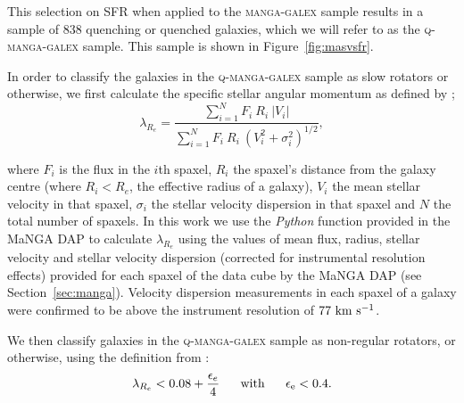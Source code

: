\documentclass[useAMS,usenatbib]{mn2e}
\begin{document}
This selection on SFR when applied to the \textsc{manga-galex} sample results in a sample of $838$ quenching or quenched galaxies, which we will refer to as the \textsc{q-manga-galex} sample. This sample is shown in Figure~\ref{fig:masvsfr}.


In order to classify the galaxies in the \textsc{q-manga-galex} sample as slow rotators or otherwise, we first calculate the specific stellar angular momentum as defined by \cite{emsellem07, emsellem11};
\begin{equation}
\lambda_{R_{e}} = \frac{\sum_{i=1}^{N} F_i\ R_i\ |V_i|}{\sum_{i=1}^{N} F_i\ R_i\ (V_i^2 + \sigma_i^2)^{1/2}},
\end{equation}	

where $F_i$ is the flux in the $i$th spaxel, $R_i$ the spaxel's distance from the galaxy centre (where $R_i < R_e$, the effective radius of a galaxy), $V_i$ the mean stellar velocity in that spaxel, $\sigma_i$ the stellar velocity dispersion in that spaxel and $N$ the total number of spaxels. In this work we use the \emph{Python} function provided in the MaNGA DAP to calculate $\lambda_{R_{e}}$ using the values of mean flux, radius, stellar velocity and stellar velocity dispersion (corrected for instrumental resolution effects) provided for each spaxel of the data cube by the MaNGA DAP (see Section~\ref{sec:manga}). Velocity dispersion measurements in each spaxel of a galaxy were confirmed to be above the instrument resolution of $77~\rm{km}~\rm{s}^{-1}$.

We then classify galaxies in the \textsc{q-manga-galex} sample as non-regular rotators, or otherwise, using the definition from \cite{cappellari16}:
\begin{equation}\label{eq:fvs}
\lambda_{R_{e}} < 0.08 + \frac{\epsilon_e}{4} ~~~~~ \rm{with} ~~~~~ \epsilon_e < 0.4.
\end{equation}
\end{document}
